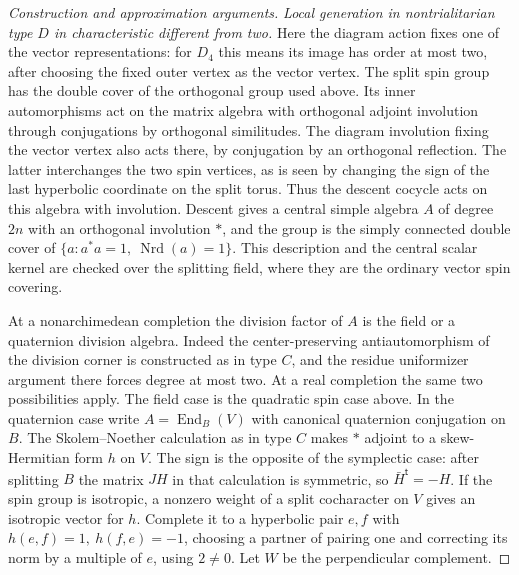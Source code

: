 \documentclass[11pt,a4paper,openany,oneside]{book}
\theoremstyle{resultstyle}
\theoremstyle{definition}
\numberwithin{equation}{chapter}
\begin{document}
\begin{proof}[Construction and approximation arguments]
\medskip\noindent
\textit{Local generation in nontrialitarian type \(D\) in
characteristic different from two.}
Here the diagram action fixes one of the vector
representations: for \(D_4\) this means its image
has order at most two, after choosing the fixed
outer vertex as the vector vertex. The split
spin group has the double cover of the orthogonal
group used above. Its inner automorphisms act on
the matrix algebra with orthogonal adjoint
involution through conjugations by orthogonal
similitudes. The diagram involution fixing the
vector vertex also acts there, by conjugation by
an orthogonal reflection. The latter interchanges
the two spin vertices, as is seen by changing
the sign of the last hyperbolic coordinate on
the split torus. Thus the descent cocycle acts on
this algebra with involution. Descent gives a
central simple algebra \(A\) of degree \(2n\)
with an orthogonal involution \(\ast\), and the
group is the simply connected double cover of
\(\{a:a^\ast a=1,\ \operatorname{Nrd}(a)=1\}\).
This description and the central scalar kernel
are checked over the splitting field, where they
are the ordinary vector spin covering.

At a nonarchimedean completion the division
factor of \(A\) is the field or a quaternion
division algebra. Indeed the center-preserving
antiautomorphism of the division corner is
constructed as in type \(C\), and the residue
uniformizer argument there forces degree at
most two. At a real completion the same two
possibilities apply. The field case is the
quadratic spin case above. In the quaternion
case write \(A=\operatorname{End}_B(V)\) with
canonical quaternion conjugation on \(B\).
The Skolem--Noether calculation as in type \(C\)
makes \(\ast\) adjoint to a skew-Hermitian
form \(h\) on \(V\). The sign is the opposite
of the symplectic case: after splitting \(B\)
the matrix \(JH\) in that calculation is
symmetric, so \(\bar H^{\mathsf t}=-H\).
If the spin group is isotropic, a nonzero
weight of a split cocharacter on \(V\) gives
an isotropic vector for \(h\). Complete it to
a hyperbolic pair \(e,f\) with
\(h(e,f)=1,\ h(f,e)=-1\), choosing a partner
of pairing one and correcting its norm by
a multiple of \(e\), using \(2\ne0\).
Let \(W\) be the perpendicular complement.


\end{proof}
\end{document}
